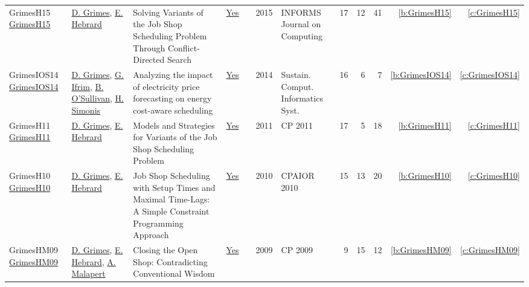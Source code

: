 {\begin{longtable}{>{\raggedright\arraybackslash}p{3cm}>{\raggedright\arraybackslash}p{6cm}>{\raggedright\arraybackslash}p{6.5cm}rrrp{2.5cm}rrrrr}
GrimesH15 \href{https://doi.org/10.1287/ijoc.2014.0625}{GrimesH15} & \hyperref[auth:a183]{D. Grimes}, \hyperref[auth:a1]{E. Hebrard} & Solving Variants of the Job Shop Scheduling Problem Through Conflict-Directed Search & \href{../works/GrimesH15.pdf}{Yes} & \cite{GrimesH15} & 2015 & INFORMS Journal on Computing & 17 & 12 & 41 & \ref{b:GrimesH15} & \ref{c:GrimesH15}\\
GrimesIOS14 \href{https://doi.org/10.1016/j.suscom.2014.08.009}{GrimesIOS14} & \hyperref[auth:a183]{D. Grimes}, \hyperref[auth:a184]{G. Ifrim}, \hyperref[auth:a16]{B. O'Sullivan}, \hyperref[auth:a17]{H. Simonis} & Analyzing the impact of electricity price forecasting on energy cost-aware scheduling & \href{../works/GrimesIOS14.pdf}{Yes} & \cite{GrimesIOS14} & 2014 & Sustain. Comput. Informatics Syst. & 16 & 6 & 7 & \ref{b:GrimesIOS14} & \ref{c:GrimesIOS14}\\
GrimesH11 \href{https://doi.org/10.1007/978-3-642-23786-7\_28}{GrimesH11} & \hyperref[auth:a183]{D. Grimes}, \hyperref[auth:a1]{E. Hebrard} & Models and Strategies for Variants of the Job Shop Scheduling Problem & \href{../works/GrimesH11.pdf}{Yes} & \cite{GrimesH11} & 2011 & CP 2011 & 17 & 5 & 18 & \ref{b:GrimesH11} & \ref{c:GrimesH11}\\
GrimesH10 \href{https://doi.org/10.1007/978-3-642-13520-0\_19}{GrimesH10} & \hyperref[auth:a183]{D. Grimes}, \hyperref[auth:a1]{E. Hebrard} & Job Shop Scheduling with Setup Times and Maximal Time-Lags: {A} Simple Constraint Programming Approach & \href{../works/GrimesH10.pdf}{Yes} & \cite{GrimesH10} & 2010 & CPAIOR 2010 & 15 & 13 & 20 & \ref{b:GrimesH10} & \ref{c:GrimesH10}\\
GrimesHM09 \href{https://doi.org/10.1007/978-3-642-04244-7\_33}{GrimesHM09} & \hyperref[auth:a183]{D. Grimes}, \hyperref[auth:a1]{E. Hebrard}, \hyperref[auth:a82]{A. Malapert} & Closing the Open Shop: Contradicting Conventional Wisdom & \href{../works/GrimesHM09.pdf}{Yes} & \cite{GrimesHM09} & 2009 & CP 2009 & 9 & 15 & 12 & \ref{b:GrimesHM09} & \ref{c:GrimesHM09}\\
\end{longtable}
}

\clearpage
